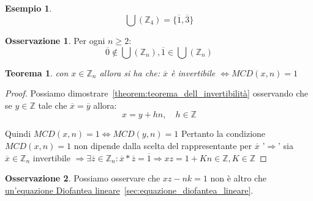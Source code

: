 \documentclass{article}
\newtheorem{exmp}{Esempio}[section]
\newtheorem{theorem}{Teorema}[section]
\theoremstyle{definition}
\newtheorem{oss}{Osservazione}[section]
\begin{document}
\begin{exmp}
        \begin{equation*}
                \bigcup(\mathbb{Z}_4) = \{\overline{1}, \overline{3}\}
        \end{equation*} 
\end{exmp}

\begin{tcolorbox}
        
\begin{oss}
        Per ogni $n \ge 2$:
        \begin{equation*}
                \overline{0} \not \in \bigcup(\mathbb{Z}_n), \overline{1} \in \bigcup(\mathbb{Z}_n)
        \end{equation*}

\end{oss}
\end{tcolorbox}

\begin{tcolorbox}
\begin{theorem}
        con $x \in \mathbb{Z}_n$ allora si ha che:\newline
        $ \overline{x} $ è invertibile $\Leftrightarrow MCD(x,n) = 1$
\end{theorem}
\end{tcolorbox}

\begin{tcolorbox}
        
\begin{proof}
       Possiamo dimostrare~\ref{theorem:teorema_dell_invertibilità} osservando che se $y \in \mathbb{Z}$ tale che $\overline{x} = \overline{y}$ allora:
       \begin{equation*}
               x = y + hn, \quad h \in \mathbb{Z}
       \end{equation*}

       Quindi $MCD(x,n) = 1 \Leftrightarrow MCD(y,n) = 1$
       Pertanto la condizione $MCD(x,n) = 1$ non dipende dalla scelta del rappresentante per $\overline{x}$ \newline
       '$\Rightarrow$' sia $\overline{x} \in \mathbb{Z}_n$ invertibile $ \Rightarrow \exists \overline{z} \in \mathbb{Z}_n : \overline{x} * \overline{z} = \overline{1} \Rightarrow xz = 1 + Kn \in \mathbb{Z}, K \in \mathbb{Z}$
\end{proof}
\end{tcolorbox}

\begin{tcolorbox}
\begin{oss}
       Possiamo osservare che $xz - nk = 1$ non è altro che \underline{un'equazione Diofantea lineare}~\ref{sec:equazione_diofantea_lineare}.
\end{oss}
\end{tcolorbox}
\end{document}
